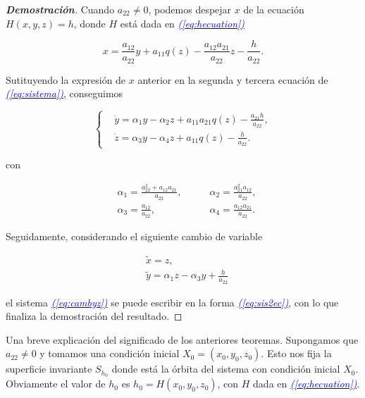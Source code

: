 \documentclass[12pt,a4paper]{report} %
\newcommand{\eref}[1]{\hyperref[#1]{\textcolor{blue}{\textit{(\ref*{#1})}}}}
\begin{document}
	\begin{proof}[\textbf{Demostración}]
		 Cuando $a_{22}\neq0$, podemos despejar $x$ de la ecuación $H(x,y,z)=h$, donde $H$ está dada en \eref{eq:hecuation}
		
		\begin{equation}
			\label{eq:xeqn}
			x=\frac{a_{12}}{a_{22}}y+a_{11}q(z)-\frac{a_{12}a_{21}}{a_{22}}z-\frac{h}{a_{22}}.
		\end{equation}\smallskip
		
		\noindent Sutituyendo la expresión de $x$ anterior en la segunda y tercera ecuación de \eref{eq:sistema}, conseguimos
		
		\begin{equation}
			\label{eq:cambyz}
			\left\{
			\begin{aligned}
				&\dot{y}=\alpha_1y-\alpha_2z+a_{11}a_{21}q(z)-\frac{a_{21}h}{a_{22}}, \\[2mm]
				&\dot{z}=\alpha_3y-\alpha_4z+a_{11}q(z)-\frac{h}{a_{22}}.
			\end{aligned}
			\right.
		\end{equation}
		
	    \noindent con
		
		\begin{equation}
			\label{eq:alphamatriz}
			\begin{aligned}
				&\alpha_1=\frac{a_{22}^2+a_{12}a_{21}}{a_{22}}, \qquad &\alpha_2=\frac{a_{21}^2a_{12}}{a_{22}},\\[2mm]
				&\alpha_3=\frac{a_{12}}{a_{22}}, \qquad &\alpha_4=\frac{a_{12}a_{21}}{a_{22}}.
			\end{aligned}
		\end{equation}\smallskip
		
		\noindent Seguidamente, considerando el siguiente cambio de variable
		
		\begin{equation}
			\label{eq:xytilde}
			\begin{aligned}
				&\tilde{x}=z, \\[2mm]
				&\tilde{y}=\alpha_1z-\alpha_3y+\frac{h}{a_{22}}
			\end{aligned}
		\end{equation}\smallskip
		
		 \noindent el sistema \eref{eq:cambyz} se puede escribir en la forma \eref{eq:sis2ec}, con lo que finaliza la demostración del resultado.
		
	\end{proof}
	
	\vspace{0.5cm}Una breve explicación del significado de los anteriores teoremas. Supongamos que $a_{22}\neq 0$ y tomamos una condición inicial $X_0=(x_0,y_0,z_0)$. Esto nos fija la superficie invariante $S_{h_0}$ donde está la órbita del sistema con condición inicial $X_0$. Obviamente el valor de $h_0$ es $h_0=H(x_0,y_0,z_0)$, con $H$ dada en \eref{eq:hecuation}.
	
\end{document}
